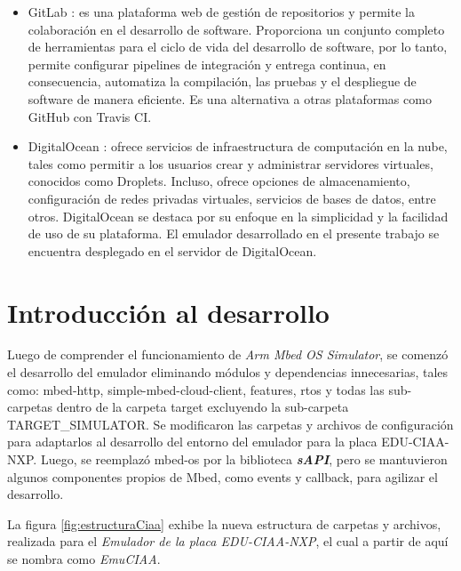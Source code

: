 \begin{itemize}
	\item GitLab \citep{GitLab}: es una plataforma web de gestión de repositorios y permite la colaboración en el desarrollo de software. Proporciona un conjunto completo de herramientas para el ciclo de vida del desarrollo de software, por lo tanto, permite configurar pipelines de integración y entrega continua, en consecuencia, automatiza la compilación, las pruebas y el despliegue de software de manera eficiente. Es una alternativa a otras plataformas como GitHub con Travis CI.
	
	\item DigitalOcean \citep{DigitalOcean}: ofrece servicios de infraestructura de computación en la nube, tales como permitir a los usuarios crear y administrar servidores virtuales, conocidos como Droplets. Incluso, ofrece opciones de almacenamiento, configuración de redes privadas virtuales, servicios de bases de datos, entre otros. DigitalOcean se destaca por su enfoque en la simplicidad y la facilidad de uso de su plataforma. El emulador desarrollado en el presente trabajo se encuentra desplegado en el servidor de DigitalOcean.

\end{itemize}

\section{Introducción al desarrollo}

Luego de comprender el funcionamiento de \textit{Arm Mbed OS Simulator}, se comenzó el desarrollo del emulador eliminando módulos y dependencias innecesarias, tales como: mbed-http, simple-mbed-cloud-client, features, rtos y todas las sub-carpetas dentro de la carpeta \textquotedbl target\textquotedbl{}  excluyendo la sub-carpeta TARGET\_SIMULATOR. 
Se modificaron las carpetas y archivos de configuración para adaptarlos al desarrollo del entorno del emulador para la placa EDU-CIAA-NXP. Luego, se reemplazó \textquotedbl mbed-os\textquotedbl{}  por la biblioteca \textit{\textbf{sAPI}}, pero se mantuvieron algunos componentes propios de Mbed, como \textquotedbl events\textquotedbl{}  y \textquotedbl callback\textquotedbl, para agilizar el desarrollo.

La figura \ref{fig:estructuraCiaa} exhibe la nueva estructura de carpetas y archivos, realizada para el \textit{Emulador de la placa EDU-CIAA-NXP}, el cual a partir de aquí se nombra como \textit{EmuCIAA}.

